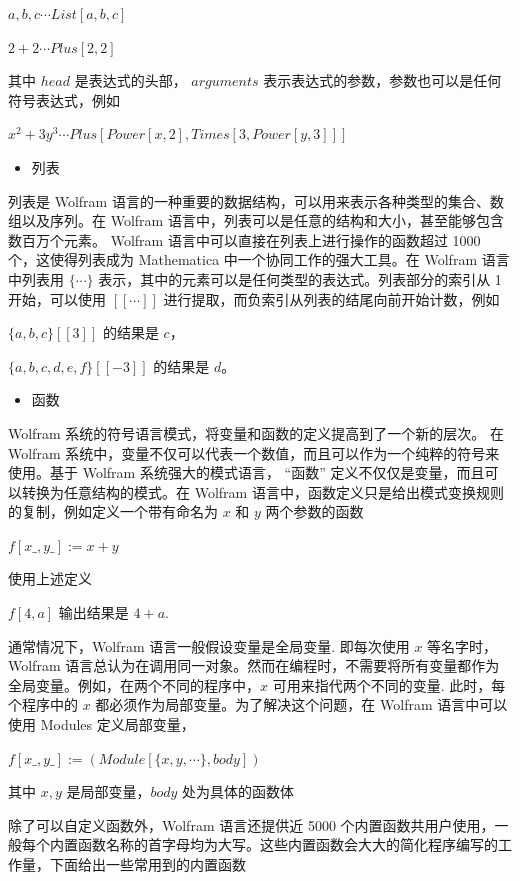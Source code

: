 ${a, b, c} \cdots List[a, b, c]$

$2 + 2 \cdots Plus[2, 2]$

其中 $head$ 是表达式的头部， $arguments$ 表示表达式的参数，参数也可以是任何符号表达式，例如

$x^2 + 3y^3 \cdots Plus[Power[x, 2], Times[3, Power[y, 3]]]$

\begin{itemize}
   \item 列表
\end{itemize}

列表是 Wolfram 语言的一种重要的数据结构，可以用来表示各种类型的集合、数组以及序列。在 Wolfram 语言中，列表可以是任意的结构和大小，甚至能够包含数百万个元素。 Wolfram 语言中可以直接在列表上进行操作的函数超过 1000 个，这使得列表成为 Mathematica 中一个协同工作的强大工具。在 Wolfram 语言中列表用 $\{\cdots\}$ 表示，其中的元素可以是任何类型的表达式。列表部分的索引从 1 开始，可以使用 $[[\cdots]]$ 进行提取，而负索引从列表的结尾向前开始计数，例如

$\{a, b, c\}[[3]]$ 的结果是 $c$，

$\{a, b, c, d, e, f\}[[-3]]$ 的结果是 $d$。

\begin{itemize}
    \item 函数
\end{itemize}

Wolfram 系统的符号语言模式，将变量和函数的定义提高到了一个新的层次。 在 Wolfram 系统中，变量不仅可以代表一个数值，而且可以作为一个纯粹的符号来使用。基于 Wolfram 系统强大的模式语言， “函数” 定义不仅仅是变量，而且可以转换为任意结构的模式。在 Wolfram 语言中，函数定义只是给出模式变换规则的复制，例如定义一个带有命名为 $x$ 和 $y$ 两个参数的函数

$f[x\_ , y\_ ]:= x + y$

使用上述定义

$f[4, a]$ 输出结果是 $4 + a$.

通常情况下，Wolfram 语言一般假设变量是全局变量. 即每次使用  $x$ 等名字时，Wolfram 语言总认为在调用同一对象。然而在编程时，不需要将所有变量都作为全局变量。例如，在两个不同的程序中，$x$ 可用来指代两个不同的变量. 此时，每个程序中的 $x$ 都必须作为局部变量。为了解决这个问题，在 Wolfram 语言中可以使用  Modules 定义局部变量，

$f[x\_ , y\_ ]:= (Module[\{x, y, \cdots\}, body])$

其中 $x, y$ 是局部变量，$body$ 处为具体的函数体

除了可以自定义函数外，Wolfram 语言还提供近 5000 个内置函数共用户使用，一般每个内置函数名称的首字母均为大写。这些内置函数会大大的简化程序编写的工作量，下面给出一些常用到的内置函数

